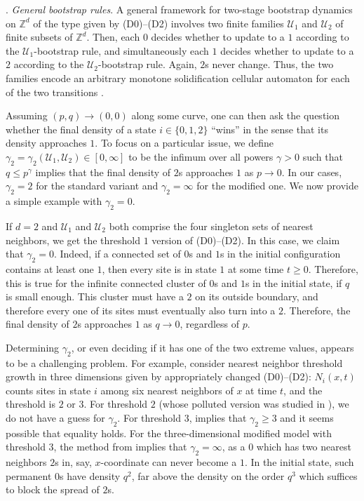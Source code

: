 \documentclass{article}
\newcommand{\bZ}{{\mathbb Z}}
\newcommand{\cU}{\mathcal U}
\numberwithin{equation}{section}
\begin{document}

 \bigskip
 
. {\it General bootstrap rules\/}.
A general framework for two-stage bootstrap dynamics on $\bZ^d$ of the 
type given by (D0)--(D2)
involves two finite families $\cU_1$ and $\cU_2$ of finite subsets 
of $\bZ^d$. Then, each $0$ decides whether to update to a $1$ according 
to the $\cU_1$-bootstrap rule, and simultaneously each $1$ decides whether 
to update to a $2$  according 
to the $\cU_2$-bootstrap rule. Again, $2$s never change. Thus, 
the two families encode an arbitrary monotone solidification cellular automaton for
each of the two transitions
\cite{Bollobs2022, BBMS2022, BBMS22, Ghosh}. 

Assuming $(p,q)\to(0,0)$ along some curve, one can then ask the 
question whether the final density of a state $i\in\{0,1,2\}$ ``wins'' in the sense that its density
approaches $1$. To focus on a 
particular issue, 
we define $\gamma_2=\gamma_2(\cU_1,\cU_2)\in[0,\infty]$ 
to be the infimum over all 
powers $\gamma>0$ such that $q\le p^\gamma$ implies that 
the final density of $2$s approaches $1$ as $p\to 0$. 
In our cases, $\gamma_2=2$ for the standard variant and $\gamma_2=\infty$
for the modified one. We now provide a simple example with $\gamma_2=0$.

If $d=2$ and $\cU_1$ and $\cU_2$ both comprise the four singleton
sets of nearest neighbors, we get the threshold $1$ version of (D0)--(D2). 
In this case, we claim that 
$\gamma_2=0$. Indeed, 
if a connected set of $0$s and $1$s in the initial configuration 
contains at least one $1$, then every site 
is in state 
$1$ at some time $t\ge 0$. Therefore, 
this is true for the infinite connected cluster 
of $0$s and $1$s in the initial state, if $q$ is small enough. This cluster must have a $2$
on its outside boundary, and therefore every one of its sites must eventually 
also turn into a $2$. Therefore, the final density of $2$s approaches $1$
as $q\to 0$, regardless of $p$. 

Determining $\gamma_2$, or even deciding if it has one of the 
two extreme values, appears to be a challenging problem. For example, 
consider nearest neighbor 
threshold growth in three dimensions given by appropriately changed (D0)--(D2): $N_i(x,t)$ counts sites in state $i$ 
among six nearest neighbors of $x$ at time $t$, and the threshold is $2$
or $3$. For threshold $2$ (whose polluted version was studied in \cite{GravnerHolroyd}), we do not have a guess for $\gamma_2$.
For threshold $3$, 
\cite{Ding} implies that 
$\gamma_2\ge 3$ and it seems possible that equality holds. For the three-dimensional modified 
model with threshold $3$, the method from \cite{GravnerHolroydSivakoff} implies that $\gamma_2=\infty$, as a $0$ which has two nearest neighbors $2$s in, say, $x$-coordinate can never become a $1$. In the initial state, 
such permanent $0$s have density $q^2$, far above the 
density on the order $q^3$ which suffices to block the spread of $2$s. 
\end{document}
